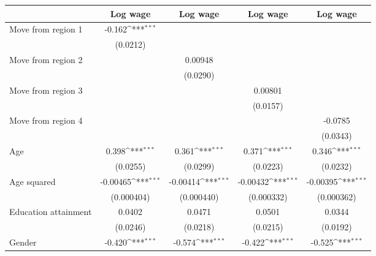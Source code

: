 {
\def\sym#1{\ifmmode^{#1}\else\(^{#1}\)\fi}
\begin{tabular*}{\textwidth}{@{\hskip\tabcolsep\extracolsep\fill}l*{4}{c}}
\toprule
                    &\multicolumn{1}{c}{Log wage}&\multicolumn{1}{c}{Log wage}&\multicolumn{1}{c}{Log wage}&\multicolumn{1}{c}{Log wage}\\
\midrule
Move from region 1  &      -0.162\sym{***}&                     &                     &                     \\
                    &    (0.0212)         &                     &                     &                     \\
\addlinespace
Move from region 2  &                     &     0.00948         &                     &                     \\
                    &                     &    (0.0290)         &                     &                     \\
\addlinespace
Move from region 3  &                     &                     &     0.00801         &                     \\
                    &                     &                     &    (0.0157)         &                     \\
\addlinespace
Move from region 4  &                     &                     &                     &     -0.0785         \\
                    &                     &                     &                     &    (0.0343)         \\
\addlinespace
Age                 &       0.398\sym{***}&       0.361\sym{***}&       0.371\sym{***}&       0.346\sym{***}\\
                    &    (0.0255)         &    (0.0299)         &    (0.0223)         &    (0.0232)         \\
\addlinespace
Age squared         &    -0.00465\sym{***}&    -0.00414\sym{***}&    -0.00432\sym{***}&    -0.00395\sym{***}\\
                    &  (0.000404)         &  (0.000440)         &  (0.000332)         &  (0.000362)         \\
\addlinespace
Education attainment&      0.0402         &      0.0471         &      0.0501         &      0.0344         \\
                    &    (0.0246)         &    (0.0218)         &    (0.0215)         &    (0.0192)         \\
\addlinespace
Gender              &      -0.420\sym{***}&      -0.574\sym{***}&      -0.422\sym{***}&      -0.525\sym{***}\\

\end{tabular*}}
